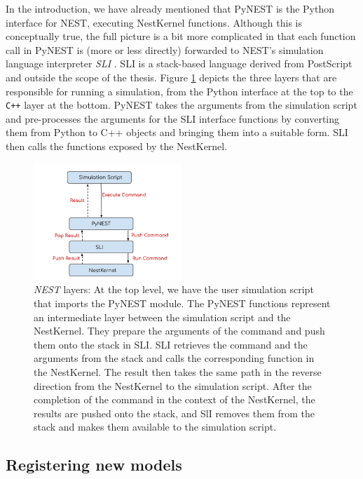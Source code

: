 In the introduction, we have already mentioned that PyNEST is the Python interface for NEST, executing NestKernel functions. Although this is conceptually true, the full picture is a bit more complicated in that each function call in PyNEST is (more or less directly) forwarded to NEST's simulation language interpreter \emph{SLI} \citep{gewaltig2007nest}. SLI is a stack-based language derived from PostScript \citep{adobe1990postscript} and outside the scope of the thesis. Figure \ref{fig:layer} depicts the three layers that are responsible for running a simulation, from the Python interface at the top to the \texttt{C++} layer at the bottom. PyNEST takes the arguments from the simulation script and pre-processes the arguments for the SLI interface functions by converting them from Python to C++ objects and bringing them into a suitable form. SLI then calls the functions exposed by the NestKernel.

\begin{figure}[h!]
\centering
\includegraphics[width=0.5\textwidth]{src/pic/layers.png}
\caption{\emph{NEST} layers: At the top level, we have the user simulation script that imports the PyNEST module. The PyNEST functions represent an intermediate layer between the simulation script and the NestKernel. They prepare the arguments of the command and push them onto the stack in SLI. SLI retrieves the command and the arguments from the stack and calls the corresponding function in the NestKernel. The result then takes the same path in the reverse direction from the NestKernel to the simulation script. After the completion of the command in the context of the NestKernel, the results are pushed onto the stack, and SlI removes them from the stack and makes them available to the simulation script.}
\label{fig:layer}
\end{figure}

\subsection{Registering new models}

